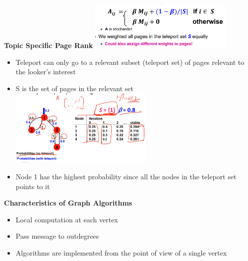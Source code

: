 \documentclass[10pt, landscape]{article}
\begin{document}
\begin{multicols}{4}
\textbf{Topic Specific Page Rank}
\includegraphics*[width=7cm]{topic_page_rank.png}
\begin{itemize}
  \item Teleport can only go to a relevant subset (teleport set) of pages relevant to the looker's interest 
  \item S is the set of pages in the relevant set
  \includegraphics*[width=7cm]{topic_page_rank_eg.png}
  \item Node 1 has the highest probability since all the nodes in the teleport set points to it
\end{itemize}

\textbf{Characteristics of Graph Algorithms}
\begin{itemize}
  \item Local computation at each vertex 
  \item Pass message to outdegrees
  \item Algorithms are implemented from the point of view of a single vertex
\end{itemize}


\end{multicols}
\end{document}
